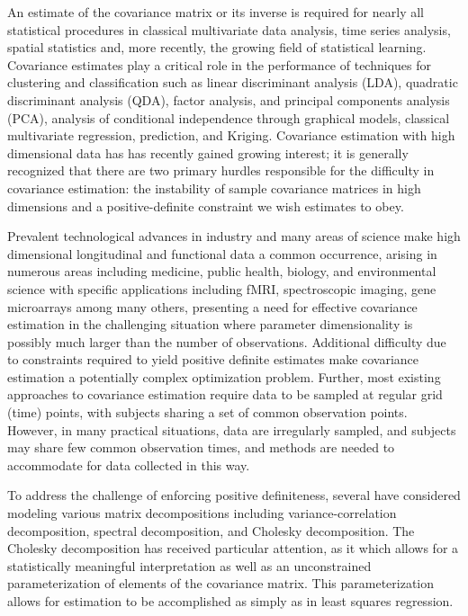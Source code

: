 \documentclass[12pt]{article}
\theoremstyle{definition}
\begin{document}
An estimate of the covariance matrix or its inverse is required for nearly all statistical procedures in classical multivariate data analysis, time series analysis, spatial statistics and, more recently, the growing field of statistical learning. Covariance estimates play a critical role in the performance of techniques for clustering and classification such as linear discriminant analysis (LDA), quadratic discriminant analysis (QDA), factor analysis, and principal components analysis (PCA), analysis of conditional independence through graphical models, classical multivariate regression, prediction, and Kriging. Covariance estimation with high dimensional data has has recently gained growing interest; it is generally recognized that there are two primary hurdles responsible for the difficulty in covariance estimation: the instability of sample covariance matrices in high dimensions and a positive-definite constraint we wish estimates to obey.

Prevalent technological advances in industry and many areas of science make high dimensional longitudinal and functional data a common occurrence, arising in numerous areas including medicine, public health, biology, and environmental science with specific applications including fMRI, spectroscopic imaging, gene microarrays among many others, presenting a need for effective covariance estimation in the challenging situation where parameter dimensionality is possibly much larger than the number of observations. Additional difficulty due to constraints required to yield positive definite estimates make covariance estimation a potentially complex optimization problem. Further, most existing approaches to covariance estimation require data to be sampled at regular grid (time) points, with subjects sharing a set of common observation points. However, in many practical situations, data are irregularly sampled, and subjects may share few common observation times, and methods are needed to accommodate for data collected in this way.  

To address the challenge of enforcing positive definiteness, several have considered modeling various matrix decompositions including variance-correlation decomposition, spectral decomposition, and Cholesky decomposition. The Cholesky decomposition has received particular attention, as it which allows for a statistically meaningful interpretation as well as an unconstrained parameterization of elements of the covariance matrix. This parameterization allows for estimation to be accomplished as simply as in least squares regression. 
\end{document}
